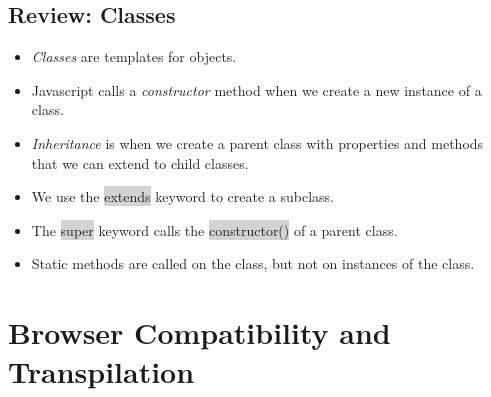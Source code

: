 \documentclass[11pt]{article}
\begin{document}
\subsection{Review: Classes}
\begin{itemize}[leftmargin = *]
\item \textit{Classes} are templates for objects.
\item Javascript calls a \textit{constructor} method when we create a new instance of a class.
\item \textit{Inheritance} is when we create a parent class with properties and methods that we can extend to child classes.
\item We use the \colorbox{lightgray}{extends} keyword to create a subclass.
\item The \colorbox{lightgray}{super} keyword calls the \colorbox{lightgray}{constructor()} of a parent class.
\item Static methods are called on the class, but not on instances of the class.
\end{itemize}

\newpage
\section{Browser Compatibility and Transpilation}
\end{document}
